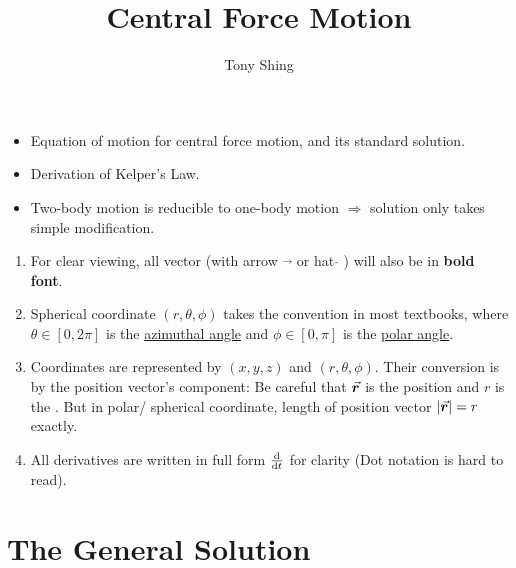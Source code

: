 \documentclass[class=article, crop=false, 12pt]{standalone}
\author{Tony Shing}
\title{Central Force Motion}
\begin{document}
\maketitle


\begin{overview}
    \begin{itemize}
        \item Equation of motion for central force motion, and its standard solution.
        \item Derivation of Kelper's Law. 
        \item Two-body motion is reducible to one-body motion $\Rightarrow$ solution only takes simple modification.
    \end{itemize}
\end{overview}


\begin{notation}
    \begin{enumerate}
        \item For clear viewing, all vector (with arrow $\vec{}$ or hat $\hat{}$ ) will also be in \textbf{bold font}.
        \item Spherical coordinate $(r,\theta, \phi)$ takes the convention in most textbooks,  
        where $\theta \in [0,2\pi]$ is the \underline{azimuthal angle} and $\phi \in [0,\pi]$ is the \underline{polar angle}.
        \item Coordinates are represented by $(x,y,z)$ and $(r,\theta,\phi)$. Their conversion is by the position vector's component: 
        Be careful that $\va*{r}$ is the position  and $r$ is the . 
        But in polar/ spherical coordinate, length of position vector $\abs{\va*{r}} = r$ exactly.
        \item All derivatives are written in full form $\dv{}{t}$ for clarity (Dot notation is hard to read). 
    \end{enumerate}
\end{notation}


\section{The General Solution}
\end{document}
